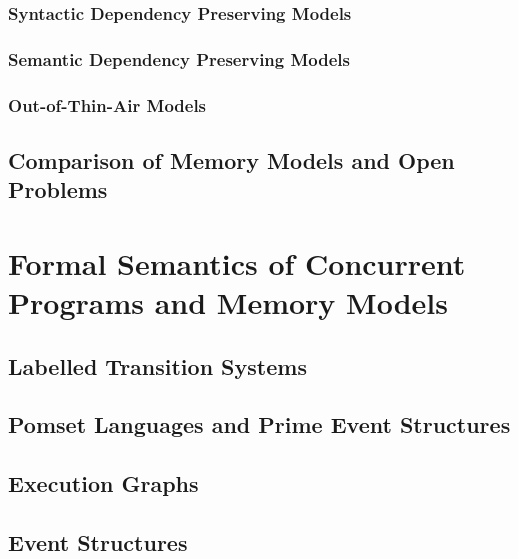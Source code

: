 \subsubsection*{Syntactic Dependency Preserving Models}

\subsubsection*{Semantic Dependency Preserving Models}

\subsubsection*{Out-of-Thin-Air Models}

\subsection{Comparison of Memory Models and Open Problems}
\label{sec:models-summary}

\section{Formal Semantics of Concurrent Programs and Memory Models}

\subsection{Labelled Transition Systems}
\label{sec:lts}

\subsection{Pomset Languages and Prime Event Structures}
\label{sec:pomsets-eventstruct}

\subsection{Execution Graphs}
\label{sec:exec-graphs}

\subsection{\Wkm Event Structures}
\label{sec:wkmo-eventstruct}
